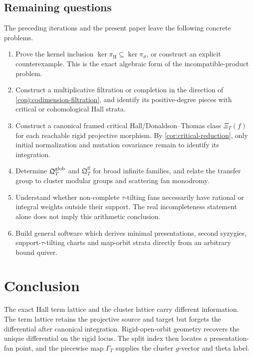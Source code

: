 \subsection{Remaining questions}

The preceding iterations and the present paper leave the following concrete
problems.
\begin{enumerate}[label=(\arabic*),leftmargin=2.4em]
\item Prove the kernel inclusion
      $\ker\pi_{\mathrm H}\subseteq\ker\pi_\vartheta$, or construct an
      explicit counterexample.  This is the exact algebraic form of the
      incompatible-product problem.
\item Construct a multiplicative filtration or completion in the direction of
      \cref{conj:codimension-filtration}, and identify its positive-degree
      pieces with critical or cohomological Hall strata.
\item Construct a canonical framed critical Hall/Donaldson--Thomas class
      $\Xi_T(f)$ for each reachable rigid projective morphism.  By
      \cref{cor:critical-reduction}, only initial normalization and mutation
      covariance remain to identify its integration.
\item Determine $\mathfrak Q^{\mathrm{glob}}_T$ and $\mathfrak Q_T^{\mathrm{ff}}$ for broad infinite
      families, and relate the transfer group to cluster modular groups and
      scattering fan monodromy.
\item Understand whether non-complete $\tau$-tilting fans necessarily have
      rational or integral weights outside their support.  The real
      incompleteness statement alone does not imply this arithmetic conclusion.
\item Build general software which derives minimal presentations, second
      syzygies, support-$\tau$-tilting charts and map-orbit strata directly
      from an arbitrary bound quiver.
\end{enumerate}

\section{Conclusion}
\label{sec:conclusion}

The exact Hall term lattice and the cluster lattice carry different
information.  The term lattice retains the projective source and target but
forgets the differential after canonical integration.  Rigid-open-orbit
geometry recovers the unique differential on the rigid locus.  The split
index then locates a presentation-fan point, and the piecewise map
$\Gamma_T$ supplies the cluster $g$-vector and theta label.

